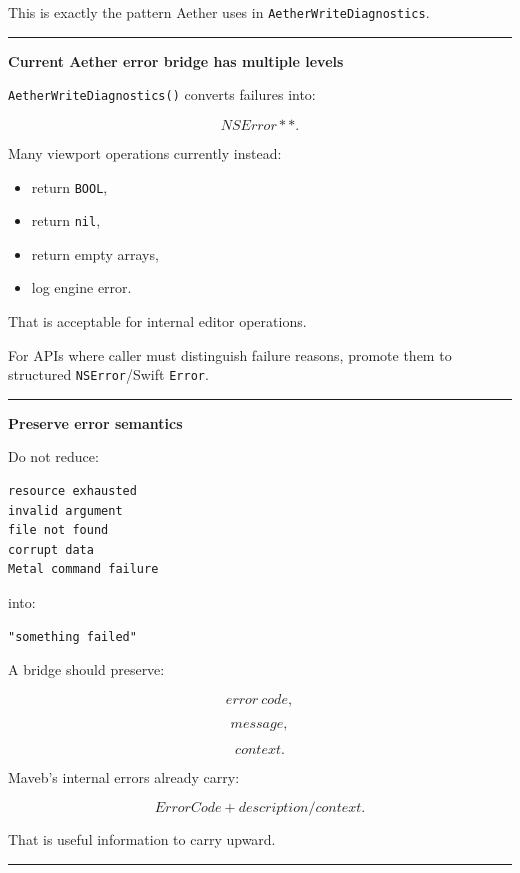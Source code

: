 This is exactly the pattern Aether uses in \texttt{AetherWriteDiagnostics}.

\begin{center}\rule{0.5\linewidth}{0.5pt}\end{center}

\textbf{Current Aether error bridge has multiple levels}

\texttt{AetherWriteDiagnostics()} converts failures into:

\[
NSError**.
\]

Many viewport operations currently instead:

\begin{itemize}
\tightlist
\item
  return \texttt{BOOL},
\item
  return \texttt{nil},
\item
  return empty arrays,
\item
  log engine error.
\end{itemize}

That is acceptable for internal editor operations.

For APIs where caller must distinguish failure reasons, promote them to structured \texttt{NSError}/Swift \texttt{Error}.

\begin{center}\rule{0.5\linewidth}{0.5pt}\end{center}

\textbf{Preserve error semantics}

Do not reduce:

\begin{verbatim}
resource exhausted
invalid argument
file not found
corrupt data
Metal command failure
\end{verbatim}

into:

\begin{verbatim}
"something failed"
\end{verbatim}

A bridge should preserve:

\[
error\ code,
\]

\[
message,
\]

\[
context.
\]

Maveb's internal errors already carry:

\[
ErrorCode
+
description/context.
\]

That is useful information to carry upward.

\begin{center}\rule{0.5\linewidth}{0.5pt}\end{center}

